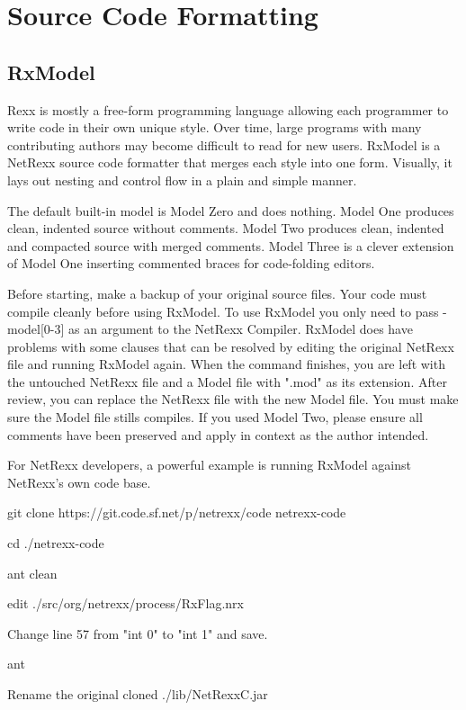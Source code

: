\chapter{Source Code Formatting}

\section{RxModel}

Rexx is mostly a free-form programming language allowing each programmer to write code in their own unique style. Over time, large programs with many contributing authors may become difficult to read for new users. RxModel is a NetRexx source code formatter that merges each style into one form. Visually, it lays out nesting and control flow in a plain and simple manner.

The default built-in model is Model Zero and does nothing. Model One produces clean, indented source without comments. Model Two produces clean, indented and compacted source with merged comments. Model Three is a clever extension of Model One inserting commented braces for code-folding editors.

Before starting, make a backup of your original source files. Your code must compile cleanly before using RxModel. To use RxModel you only need to pass -model[0-3] as an argument to the NetRexx Compiler. RxModel does have problems with some clauses that can be resolved by editing the original NetRexx file and running RxModel again. When the command finishes, you are left with the untouched NetRexx file and a Model file with ".mod" as its extension. After review, you can replace the NetRexx file with the new Model file. You must make sure the Model file stills compiles. If you used Model Two, please ensure all comments have been preserved and apply in context as the author intended.     


For NetRexx developers, a powerful example is running RxModel against NetRexx's own code base.
 
git clone https://git.code.sf.net/p/netrexx/code netrexx-code

cd ./netrexx-code

ant clean

edit ./src/org/netrexx/process/RxFlag.nrx

Change line 57 from "int     0" to "int     1" and save.  

ant

Rename the original cloned ./lib/NetRexxC.jar

